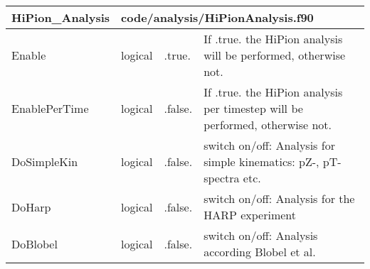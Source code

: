 \documentclass{article}
\begin{document}
\begin{longtable}{llll}
\toprule
\textbf{\large{HiPion\_Analysis}} & \multicolumn{3}{l}{\footnotesize{code/analysis/HiPionAnalysis.f90}}\\*
\midrule
\endfirsthead
\midrule
\endhead
Enable & \begin{minipage}[t]{2cm}logical\end{minipage} & \begin{minipage}[t]{2cm}.true.\end{minipage} & \begin{minipage}[t]{12cm}If .true. the HiPion analysis will be performed, otherwise not.\end{minipage}\\*
\midrule
EnablePerTime & \begin{minipage}[t]{2cm}logical\end{minipage} & \begin{minipage}[t]{2cm}.false.\end{minipage} & \begin{minipage}[t]{12cm}If .true. the HiPion analysis per timestep will be performed, otherwise not.\end{minipage}\\*
\midrule
DoSimpleKin & \begin{minipage}[t]{2cm}logical\end{minipage} & \begin{minipage}[t]{2cm}.false.\end{minipage} & \begin{minipage}[t]{12cm}switch on/off: Analysis for simple kinematics: pZ-, pT-spectra etc.\end{minipage}\\*
\midrule
DoHarp & \begin{minipage}[t]{2cm}logical\end{minipage} & \begin{minipage}[t]{2cm}.false.\end{minipage} & \begin{minipage}[t]{12cm}switch on/off: Analysis for the HARP experiment\end{minipage}\\*
\midrule
DoBlobel & \begin{minipage}[t]{2cm}logical\end{minipage} & \begin{minipage}[t]{2cm}.false.\end{minipage} & \begin{minipage}[t]{12cm}switch on/off: Analysis according Blobel et al.\end{minipage}\\*

\end{longtable}
\end{document}

